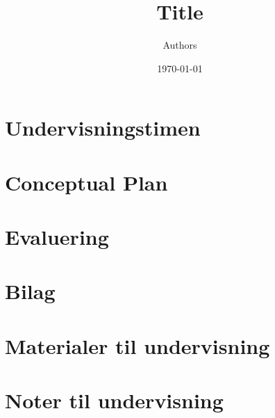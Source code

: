 \documentclass[a4paper, 10pt, danish, final]{article}
\title{Title}
\author{Authors}
\date{\today}
\begin{document}
\maketitle
\thispagestyle{empty}
\pagestyle{headings}



\tableofcontents
\newpage

\section{Undervisningstimen}


\section{Conceptual Plan}


\section{Evaluering}


\newpage
\section*{Bilag} 
\appendix

\section{Materialer til undervisning}

\newpage

\section{Noter til undervisning}

\end{document}
